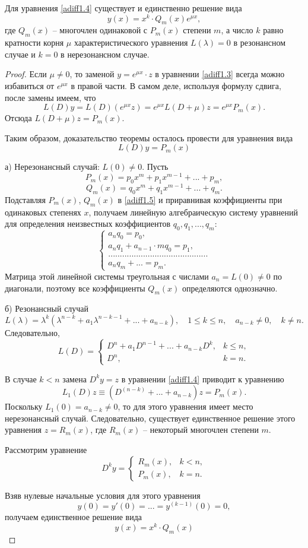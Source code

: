 \begin{thm} 
Для уравнения \eqref{adiff1.4} существует и единственно решение вида
$$
y(x)=x^k\cdot Q_m(x)e^{\mu x},
$$
где $Q_m(x)$ -- многочлен одинаковой с $P_m(x)$ степени $m$, а число $k$ равно кратности корня $\mu$ характеристического уравнения $L(\lambda)=0$ в резонансном случае и $k=0$ в нерезонансном случае.
\end{thm}

\begin{proof}
Если $\mu\neq 0$, то заменой $y=e^{\mu x}\cdot z$ в уравнении \eqref{adiff1.3} всегда можно избавиться от $e^{\mu x}$ в правой части. В самом деле,  используя формулу сдвига, после замены имеем, что
$$
L(D)y=L(D)(e^{\mu x}z)=e^{\mu x}L(D+\mu)z=e^{\mu x}P_m(x).
$$
Отсюда $L(D+\mu)z=P_m(x)$.

Таким образом, доказательство теоремы осталось провести для уравнения вида
\begin{equation}\label{adiff1.5}
L(D)y=P_m(x)
\end{equation}

а) Нерезонансный случай: $L(0)\neq 0$. Пусть
$$
P_m(x)=p_0x^m+p_1x^{m-1}+...+p_m,
$$
$$
Q_m(x)=q_0x^m+q_1x^{m-1}+...+q_m.
$$
Подставляя $P_m(x)$, $Q_m(x)$ в \eqref{adiff1.5} и приравнивая коэффициенты при одинаковых степенях $x$, получаем линейную алгебраическую систему уравнений для  определения неизвестных коэффициентов $q_0,q_1,...,q_m$:
$$
\begin{cases}
a_nq_0=p_0,\\
a_nq_1+a_{n-1}\cdot m q_0=p_1,\\
...........................................\\
a_nq_m+...=p_m.
\end{cases}
$$
Матрица этой линейной системы треугольная с числами $a_n=L(0)\neq 0$ по диагонали, поэтому все коэффициенты $Q_m(x)$ определяются однозначно.

б) Резонансный случай
$$
L(\lambda)=\lambda^k(\lambda^{n-k}+a_1\lambda^{n-k-1}+...+a_{n-k}),\quad 1\leq k \leq n,\quad a_{n-k}\neq 0,\quad k\neq n.
$$
Следовательно,
$$
L(D)=\begin{cases}
D^n+a_1D^{n-1}+...+a_{n-k}D^k, &k\leq n,\\
D^n, &k=n.
\end{cases}
$$

В случае $k<n$ замена $D^ky=z$ в уравнении \eqref{adiff1.4} приводит к уравнению
$$
L_1(D)z\equiv (D^{(n-k)}+...+a_{n-k})z=P_m(x).
$$
Поскольку $L_1(0)=a_{n-k}\neq 0$, то для этого уравнения имеет место нерезонансный случай. Следовательно, существует единственное решение этого уравнения $z=R_m(x)$, где $R_m(x)$ -- некоторый многочлен степени $m$.


Рассмотрим уравнение
$$
D^ky=\begin{cases}
R_m(x), &k<n,\\
P_m(x), &k=n.
\end{cases}
$$

Взяв нулевые начальные условия для этого уравнения
$$
y(0)=y'(0)=...=y^{(k-1)}(0)=0,
$$
получаем единственное решение вида
$$
y(x)=x^k\cdot Q_m(x)
$$
\end{proof}
